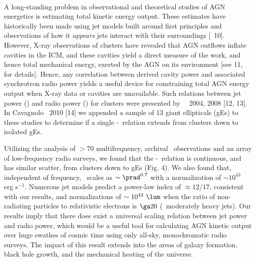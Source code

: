 \documentclass[letterpaper,12pt]{article}
\newcommand{\myhead}{Cavagnolo, Research Summary}
\begin{document}
\markright{\myhead}\\
 A long-standing problem in
observational and theoretical studies of AGN energetics is estimating
total kinetic energy output. These estimates have historically been
made using jet models built around first principles and observations
of how it {\it{appears}} jets interact with their surroundings
[\eg\ 10]. However, X-ray observations of clusters have revealed that
AGN outflows inflate cavities in the ICM, and these cavities yield a
direct measure of the work, and hence total mechanical energy, exerted
by the AGN on its environment [see 11, for details]. Hence, any
correlation between derived cavity power and associated synchrotron
radio power yields a useful device for constraining total AGN energy
output when X-ray data or cavities are unavailable. Such relations
between jet power (\pjet) and radio power (\prad) for clusters were
presented by \birzan\ \etal\ 2004, 2008 [12, 13]. In Cavagnolo
\etal\ 2010 [14] we appended a sample of 13 giant ellipticals (gEs) to
these studies to determine if a single \pjet-\prad\ relation extends
from clusters down to isolated gEs.

Utilizing the analysis of $> 70$ multifrequency, archival
\vla\ observations and an array of low-frequency radio surveys, we
found that the \pjet-\prad\ relation is continuous, and has similar
scatter, from clusters down to gEs (Fig. 4). We also found that,
independent of frequency, \pjet\ scales as $\sim \prad^{0.7}$ with a
normalization of $\sim 10^{43}$ erg s$^{-1}$. Numerous jet models
predict a power-law index of $\approx 12/17$, consistent with our
results, and normalizations of $\sim 10^{43} ~\lum$ when the ratio of
non-radiating particles to relativistic electrons is $\ga 20$
(\ie\ moderately heavy jets). Our results imply that there does exist
a universal scaling relation between jet power and radio power, which
would be a useful tool for calculating AGN kinetic output over huge
swathes of cosmic time using only all-sky, monochromatic radio
surveys. The impact of this result extends into the areas of galaxy
formation, black hole growth, and the mechanical heating of the
universe.
\end{document}
